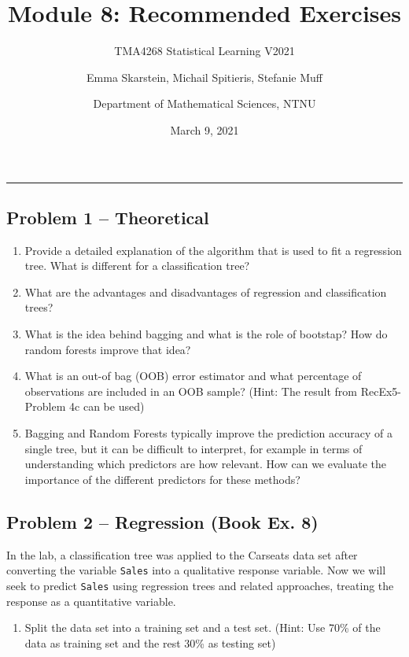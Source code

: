 \documentclass[]{article}
\title{Module 8: Recommended Exercises}
\subtitle{TMA4268 Statistical Learning V2021}
\author{Emma Skarstein, Michail Spitieris, Stefanie Muff \and Department of Mathematical Sciences, NTNU}
\date{March 9, 2021}
\providecommand{\tightlist}{%
  \setlength{\itemsep}{0pt}\setlength{\parskip}{0pt}}
\begin{document}
\maketitle

\begin{center}\rule{0.5\linewidth}{0.5pt}\end{center}

\hypertarget{problem-1-theoretical}{%
\subsection{Problem 1 -- Theoretical}\label{problem-1-theoretical}}

\begin{enumerate}
\def\labelenumi{\alph{enumi})}
\item
  Provide a detailed explanation of the algorithm that is used to fit a
  regression tree. What is different for a classification tree?
\item
  What are the advantages and disadvantages of regression and
  classification trees?
\item
  What is the idea behind bagging and what is the role of bootstap? How
  do random forests improve that idea?
\item
  What is an out-of bag (OOB) error estimator and what percentage of
  observations are included in an OOB sample? (Hint: The result from
  RecEx5-Problem 4c can be used)
\item
  Bagging and Random Forests typically improve the prediction accuracy
  of a single tree, but it can be difficult to interpret, for example in
  terms of understanding which predictors are how relevant. How can we
  evaluate the importance of the different predictors for these methods?
\end{enumerate}

\hypertarget{problem-2-regression-book-ex.-8}{%
\subsection{Problem 2 -- Regression (Book Ex.
8)}\label{problem-2-regression-book-ex.-8}}

In the lab, a classification tree was applied to the Carseats data set
after converting the variable \texttt{Sales} into a qualitative response
variable. Now we will seek to predict \texttt{Sales} using regression
trees and related approaches, treating the response as a quantitative
variable.

\begin{enumerate}
\def\labelenumi{\alph{enumi})}
\tightlist
\item
  Split the data set into a training set and a test set. (Hint: Use 70\%
  of the data as training set and the rest 30\% as testing set)
\end{enumerate}
\end{document}

